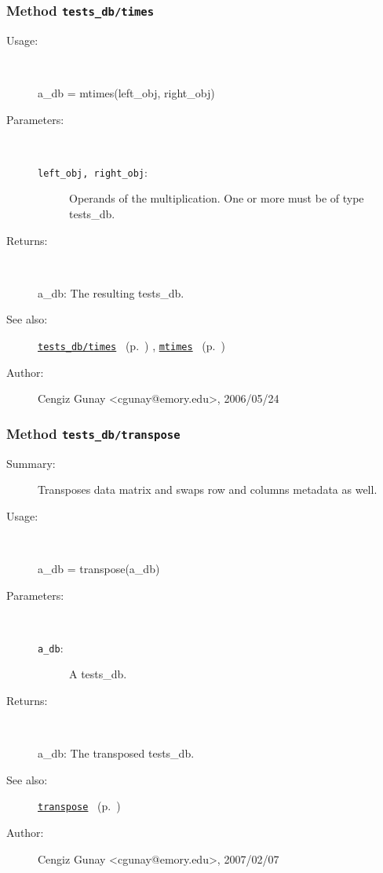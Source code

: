 \subsubsection[Method \texttt{times}]{Method \texttt{tests\_db/times}}%
%
\label{ref_tests_db__times}%
\hypertarget{ref_tests_db__times}{}%
\begin{description}
%
\item[Usage:]~%
\begin{lyxcode}%
a\_db = mtimes(left\_obj, right\_obj)
%
\end{lyxcode}%
%
%
\item[Parameters:]~
\begin{description}%
\item[\texttt{left\_obj, right\_obj}:]
 Operands of the multiplication. One or more must be of type tests\_db.
\end{description}%
%
\item[Returns:
]~

	a\_db: The resulting tests\_db.
%
%
\item[See also:]%
\hyperlink{ref_tests_db__times}{\texttt{tests\_db/times}}%
\ (p.~\pageref{ref_tests_db__times})%
%
, \hyperlink{ref_mtimes}{\texttt{mtimes}}%
\ (p.~\pageref{ref_mtimes})%
%
%
\item[Author:]%
Cengiz Gunay <cgunay@emory.edu>, 2006/05/24
%
\end{description}
\methodline%
\subsubsection[Method \texttt{transpose}]{Method \texttt{tests\_db/transpose}}%
%
\label{ref_tests_db__transpose}%
\hypertarget{ref_tests_db__transpose}{}%
\begin{description}
\item[Summary:]Transposes data matrix and swaps row and columns metadata as well.
%
\item[Usage:]~%
\begin{lyxcode}%
a\_db = transpose(a\_db)
%
\end{lyxcode}%
%
%
\item[Parameters:]~
\begin{description}%
\item[\texttt{a\_db}:]
 A tests\_db.
\end{description}%
%
\item[Returns:
]~

	a\_db: The transposed tests\_db.
%
%
\item[See also:]%
\hyperlink{ref_transpose}{\texttt{transpose}}%
\ (p.~\pageref{ref_transpose})%
%
%
\item[Author:]%
Cengiz Gunay <cgunay@emory.edu>, 2007/02/07
%
\end{description}
\methodline%
